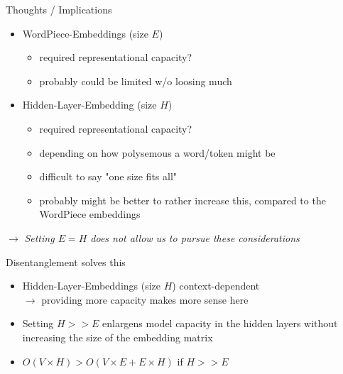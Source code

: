\begin{frame}{Thoughts / Implications}

\vfill

	\begin{itemize}
		\item	WordPiece-Embeddings (size $E$) 
			\begin{itemize}
				\item required representational capacity?
				\item probably could be limited w/o loosing much
			\end{itemize}
		\item Hidden-Layer-Embedding (size $H$)
			\begin{itemize}
				\item required representational capacity?
				\item depending on how polysemous a word/token might be
				\item difficult to say "one size fits all"
				\item probably might be better to rather increase this, compared to the WordPiece embeddings
			\end{itemize}
	\end{itemize}
	
\vspace{.5cm}

$\to$ \textit{Setting $E = H$ does not allow us to pursue these considerations}

\vfill

\end{frame}


\begin{frame}{Disentanglement solves this}

\vfill

	\begin{itemize}
		\item Hidden-Layer-Embeddings (size $H$) context-dependent\\
					$\to$ providing more capacity makes more sense here
		\item Setting $H >> E$ enlargens model capacity in the hidden layers without increasing the size of the embedding matrix
		\item $O(V \times H) > O(V \times E +  E \times H)$ if $H >> E$
\end{itemize}

\vfill

\end{frame}

